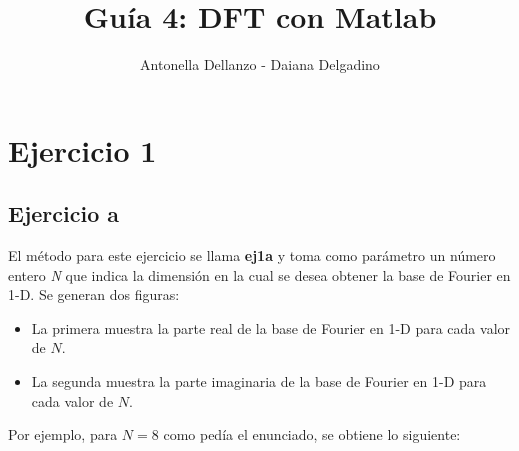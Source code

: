 \documentclass{article}
\begin{document}
\author{Antonella Dellanzo - Daiana Delgadino}
\title{Guía 4: DFT con Matlab}
\date{}
\maketitle

\section*{Ejercicio 1}

\subsection*{Ejercicio a}

El método para este ejercicio se llama \textbf{ej1a} y toma como parámetro un número entero \textit{N} que indica la dimensión en la cual se desea obtener la base de Fourier en 1-D. Se generan dos figuras:
\begin{itemize}
\item La primera muestra la parte real de la base de Fourier en 1-D para cada valor de $N$.
\item La segunda muestra la parte imaginaria de la base de Fourier en 1-D para cada valor de $N$.
\end{itemize}
Por ejemplo, para $N=8$ como pedía el enunciado, se obtiene lo siguiente:
\end{document}
